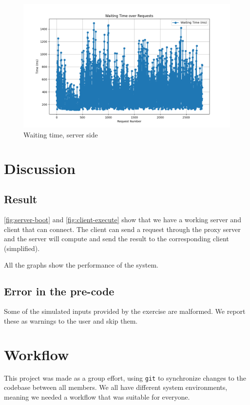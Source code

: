 \documentclass{article}
\def\code#1{\colorbox{gray!20}{\texttt{#1}}}
\begin{document}
\begin{figure}
    \centering
    \includegraphics[width=1.0\linewidth]{Waiting Time.png}
    \caption{Waiting time, server side}
    \label{fig:waiting-time}
\end{figure}

\section{Discussion}
\subsection{Result}
\ref{fig:server-boot} and \ref{fig:client-execute} show that we have a working server and client that can connect. The client can send a request through the proxy server and the server will compute and send the result to the corresponding client (simplified). 

All the graphs show the performance of the system. 

\subsection{Error in the pre-code}
Some of the simulated inputs provided by the exercise are malformed. We report these as warnings to the user and skip them.

\section{Workflow}
This project was made as a group effort, using \code{git} to synchronize changes to the codebase between all members.  We all have different system environments, meaning we needed a workflow that was suitable for everyone.
\end{document}
